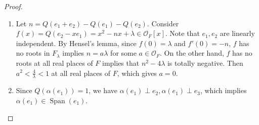 \documentclass{amsart}
\numberwithin{equation}{subsection}
\numberwithin{theorem}{section}
\theoremstyle{definition}
\theoremstyle{remark}
\DeclareMathOperator{\Span}{Span}
\begin{document}
\begin{proof}
    \begin{enumerate}
        \item Let $n = Q(e_1+e_2)-Q(e_1)-Q(e_2)$. Consider $f(x) = Q(e_2-xe_1) = x^2-nx+\lambda \in \mathcal{O}_F[x]$. Note that $e_1, e_2$ are linearly independent. By Hensel's lemma, since $f(0) = \lambda$ and $ f'(0) = -n$, $f$ has no roots in $F_{\lambda}$ implies $n=a\lambda$ for some $a\in\mathcal{O}_F$. On the other hand, $f$ has no roots at all real places of $F$ implies that $n^2-4\lambda$ is totally negative. Then $a^2 < \frac{4}{\lambda}<1$ at all real places of $F$, which gives $a = 0$. 
        \item Since $Q(\alpha(e_1)) = 1$, we have $\alpha(e_1) \perp e_2, \alpha(e_1)\perp e_3$, which implies $\alpha(e_1) \in \Span(e_1)$.
    \end{enumerate}
\end{proof}
\end{document}
